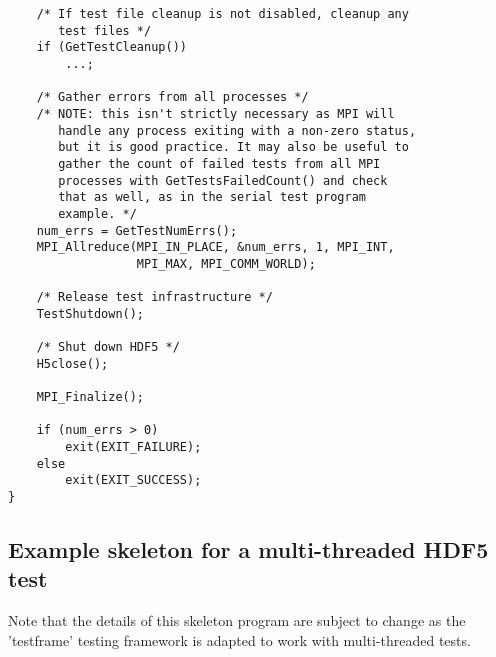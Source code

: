 \documentclass[../HDF5_RFC.tex]{subfiles}
\begin{document}
\begin{verbatim}
    /* If test file cleanup is not disabled, cleanup any
       test files */
    if (GetTestCleanup())
        ...;

    /* Gather errors from all processes */
    /* NOTE: this isn't strictly necessary as MPI will
       handle any process exiting with a non-zero status,
       but it is good practice. It may also be useful to
       gather the count of failed tests from all MPI
       processes with GetTestsFailedCount() and check
       that as well, as in the serial test program
       example. */
    num_errs = GetTestNumErrs();
    MPI_Allreduce(MPI_IN_PLACE, &num_errs, 1, MPI_INT,
                  MPI_MAX, MPI_COMM_WORLD);

    /* Release test infrastructure */
    TestShutdown();

    /* Shut down HDF5 */
    H5close();

    MPI_Finalize();

    if (num_errs > 0)
        exit(EXIT_FAILURE);
    else
        exit(EXIT_SUCCESS);
}
\end{verbatim}

\subsection{\textbf{Example skeleton for a multi-threaded HDF5 test}}
\label{apdx:multithread_example}

Note that the details of this skeleton program are subject to change as the 'testframe'
testing framework is adapted to work with multi-threaded tests.
\end{document}

